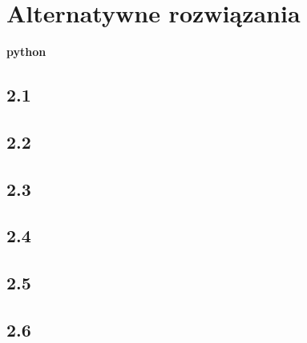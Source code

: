 \documentclass[a4paper,twoside,7pt]{book}
\begin{document}
\section{Alternatywne rozwiązania}
\begin{center}
\large \textbf{python}
\end{center}
\small
\begin{multicols}{2}
\begin{flushleft}
    \hspace{1cm}
    \begin{minipage}{3cm}
        \subsection*{2.1}
            

        \subsection*{2.2}
        

        \subsection*{2.3}
           
        \end{minipage}  
\end{flushleft}
\subsection*{2.4}

\subsection*{2.5}

\vspace{7.05cm}
\subsection*{2.6}

\end{multicols}
\newpage
\end{document}
